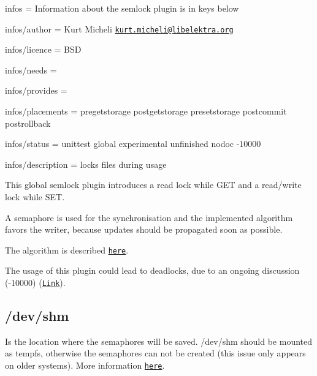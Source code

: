 
\begin{DoxyItemize}
\item infos = Information about the semlock plugin is in keys below
\item infos/author = Kurt Micheli \href{mailto:kurt.micheli@libelektra.org}{\tt kurt.\+micheli@libelektra.\+org}
\item infos/licence = B\+SD
\item infos/needs =
\item infos/provides =
\item infos/placements = pregetstorage postgetstorage presetstorage postcommit postrollback
\item infos/status = unittest global experimental unfinished nodoc -\/10000
\item infos/description = locks files during usage
\end{DoxyItemize}

This global semlock plugin introduces a read lock while {\ttfamily G\+ET} and a read/write lock while {\ttfamily S\+ET}.

A semaphore is used for the synchronisation and the implemented algorithm favors the writer, because updates should be propagated soon as possible.

The algorithm is described \href{https://en.wikipedia.org/wiki/Readers%E2%80%93writers_problem#Second_readers-writers_problem}{\tt here}.

The usage of this plugin could lead to deadlocks, due to an ongoing discussion (-\/10000) (\href{https://github.com/ElektraInitiative/libelektra/pull/555}{\tt Link}).

\subsection*{/dev/shm}

Is the location where the semaphores will be saved. {\ttfamily /dev/shm} should be mounted as tempfs, otherwise the semaphores can not be created (this issue only appears on older systems). More information \href{http://stackoverflow.com/questions/270113/how-do-i-stop-sem-open-failing-with-enosys}{\tt here}. 